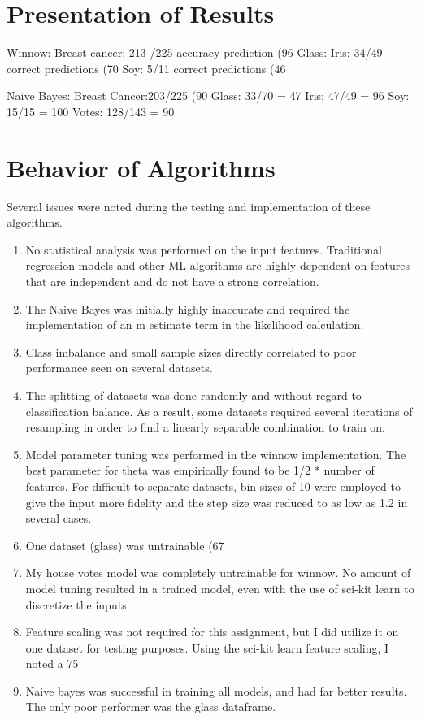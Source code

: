 \documentclass[11pt]{article}
\begin{document}
\section{Presentation of Results}
Winnow:
Breast cancer: 213 /225  accuracy prediction (96%
Glass: 
Iris: 34/49 correct predictions (70%
Soy: 5/11 correct predictions (46%

Naive Bayes:
Breast Cancer:203/225 (90%
Glass: 33/70 = 47%
Iris: 47/49 = 96%
Soy: 15/15 = 100%
Votes: 128/143 = 90%
\section{Behavior of Algorithms}
Several issues were noted during the testing and implementation of these algorithms.
\begin{enumerate}
\item No statistical analysis was performed on the input features. Traditional regression models and other ML algorithms are highly dependent on features that are independent and do not have a strong correlation. 
\item The Naive Bayes was initially highly inaccurate and required the implementation of an m estimate term in the likelihood calculation. 
\item Class imbalance and small sample sizes directly correlated to poor performance seen on several datasets.
\item The splitting of datasets was done randomly and without regard to classification balance. As a result, some datasets required several iterations of resampling in order to find a linearly separable combination to train on.
\item Model parameter tuning was performed in the winnow implementation. The best parameter for theta was empirically found to be 1/2 * number of features. For difficult to separate datasets, bin sizes of 10 were employed to give the input more fidelity and the step size was reduced to as low as 1.2 in several cases. 
\item One dataset (glass) was untrainable (67%
\item My house votes model was completely untrainable for winnow. No amount of model tuning resulted in a trained model, even with the use of sci-kit learn to discretize the inputs. 
\item Feature scaling was not required for this assignment, but I did utilize it on one dataset for testing purposes. Using the sci-kit learn feature scaling, I noted a 75%
\item Naive bayes was successful in training all models, and had far better results. The only poor performer was the glass dataframe.

\end{enumerate}
\end{document}
